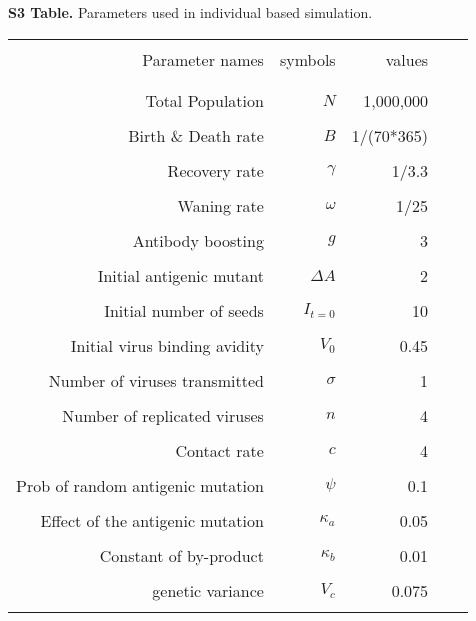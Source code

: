 \documentclass[12pt,a4paper]{article}
\begin{document}
\begin{table}
{\bf S3 Table.} Parameters used in individual based simulation.
\begin{tabular*}{13.5cm}{rrrrr}
\hline\hline \\%
Parameter names &  symbols &  values &    \\ \\
\hline \\ %
Total Population  &    $N$ &  1,000,000 &      \\ \\
Birth \& Death rate  & $B$  & 1/(70*365) &   \\ \\
Recovery rate  &  $\gamma$  & 1/3.3 &  \\ \\
Waning rate    &  $\omega$  & 1/25   &  \\ \\
Antibody boosting  & $g$     & 3     &  \\ \\
Initial antigenic mutant & $\Delta A$& 2     & \\ \\
Initial number of seeds & $I_{t=0}$& 10     & \\ \\
Initial virus binding avidity & $V_{0}$& 0.45     & \\ \\
Number of viruses transmitted & $\sigma $ & 1     &  \\ \\
Number of replicated viruses &  $n$       & 4     &  \\ \\
Contact rate &     $c$       & 4     &  \\ \\
Prob of random antigenic mutation & $\psi$  & 0.1     &  \\ \\
Effect of the antigenic mutation &  $\kappa_{a}$       & 0.05     &  \\ \\
Constant of by-product &     $\kappa_{b}$       & 0.01     &  \\ \\
genetic variance &     $V_{c}$       & 0.075     &  \\ \\
\hline %
\end{tabular*}
\end{table}
\clearpage
\end{document}
